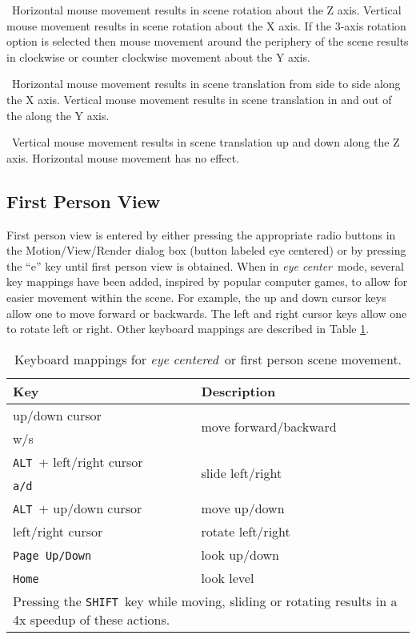 \documentclass[11pt,twoside]{book}
\newcommand{\parma}{.75}
\newcommand{\parmb}{.5}
\newcommand{\parmc}{0.25}
\newcommand{\blist}{
\begin{list}
{}{
\setlength{\leftmargin}{\parma in}
\setlength{\labelwidth}{\parmb in}
\setlength{\labelsep}{\parmc in}
\setlength{\listparindent}{0.3in}
\setlength{\topsep}{.3in}
\setlength{\parsep}{.0in}
}}
\newcommand{\elist}{\end{list}}
\newcommand{\hitem}[1]{\item[{\bf #1} \hfill]}
\begin{document}
\blist

\hitem{no modifier keys}\ Horizontal mouse movement results in
scene rotation about the Z axis. Vertical mouse movement results
in scene rotation about the X axis.  If the 3-axis rotation option
is selected then mouse movement around the periphery of the scene
results in clockwise or counter clockwise movement about the Y
axis.

\hitem{CTRL key depressed}\ Horizontal mouse movement results in
scene translation from side to side along the X axis. Vertical
mouse movement results in scene translation in and out of the
along the Y axis.

\hitem{ALT key depressed}\ Vertical mouse movement results in scene
translation up and down along the Z axis. Horizontal mouse
movement has no effect.

\elist

\subsection{First Person View}
\label{section:eyeview}
First person view is entered by either pressing the appropriate
radio buttons in the Motion/View/Render dialog box (button
labeled eye centered) or by pressing the ``e'' key until first
person view is obtained. When in {\em eye center}\ mode, several
key mappings have been added, inspired by popular computer games,
to allow for easier movement within the scene. For example, the up
and down cursor keys allow one to move forward or backwards.  The
left and right cursor keys allow one to rotate left or right.
Other keyboard mappings are described in Table \ref{tabKEYS}.

\begin{table}[bph]
\begin{center}
\caption{Keyboard mappings for {\em eye centered}\ or first person scene movement.}
\vspace{0.1in}
\begin{tabular}{|l|l|}
\hline Key &   Description  \\

\hline\hline
up/down cursor & \multirow{2}{*}{move forward/backward}\  \\
w/s &   \\\hline
{\tt ALT}\ + left/right cursor  & \multirow{2}{*}{slide left/right}\ \\
{\tt a/d}\  &  \\ \hline
{\tt ALT}\ + up/down cursor  & move up/down  \\ \hline\hline
left/right cursor  & rotate left/right \\ \hline
{\tt Page Up/Down}\  & look up/down \\ \hline
{\tt Home}\  & look level \\ \hline\hline
\multicolumn{2}{|p{3.5in}|}{Pressing the {\tt SHIFT}\ key while moving, sliding or rotating
results in a  4x speedup of these actions. }\ \\ \hline

\end{tabular}
\label{tabKEYS}
\end{center}
\end{table}
\end{document}
